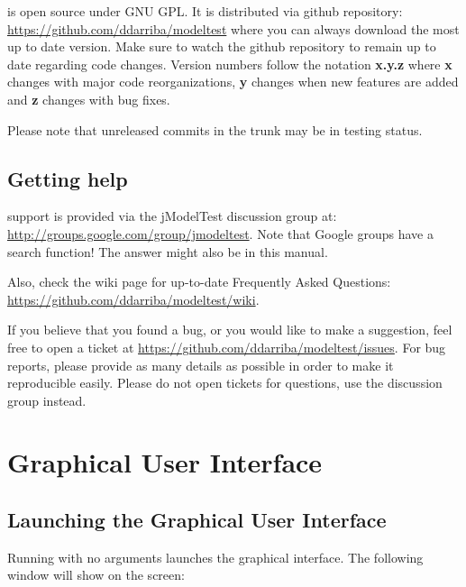 \documentclass[10pt,twoside,a4paper]{article}
\begin{document}
\modeltest is open source under GNU GPL.
It is distributed via github repository:
\url{https://github.com/ddarriba/modeltest} where you can always download the most up to date version.
Make sure to watch the github repository to remain up to date regarding code changes.
Version numbers follow the notation {\bf x.y.z} where {\bf x} changes with major code reorganizations, {\bf y}
changes when new features are added and {\bf z} changes with bug fixes.

Please note that unreleased commits in the trunk may be in testing status.

\subsection{Getting help}

\modeltest support is provided via the jModelTest discussion group at: \url{http://groups.google.com/group/jmodeltest}.  Note that Google groups have a search function! The answer might also be in this manual.

Also, check the wiki page for up-to-date Frequently Asked Questions: \url{https://github.com/ddarriba/modeltest/wiki}.

If you believe that you found a bug, or you would like to make a suggestion, feel free to open a ticket at \url{https://github.com/ddarriba/modeltest/issues}.
For bug reports, please provide as many details as possible in order to make it reproducible easily.
Please do not open tickets for questions, use the discussion group instead.





\section{Graphical User Interface}
\label{sec:gui}

\subsection{Launching the Graphical User Interface}

Running {\modeltestguibin} with no arguments launches the graphical interface.
The following window will show on the screen:
\end{document}
